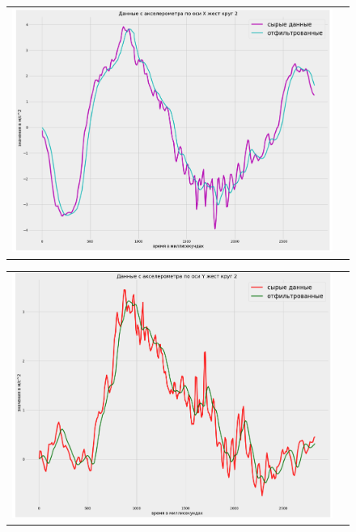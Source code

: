 \begin{figure}[H]
    \begin{center}
        \begin{tabular}{cc}
            \includegraphics[width=1\textwidth]{farim/cirxres.png} & 
        \end{tabular}
    \end{center}
\end{figure}

\begin{figure}[H]
    \begin{center}
        \begin{tabular}{cc}
            \includegraphics[width=1\textwidth]{farim/ciryres.png} & 
        \end{tabular}
    \end{center}
\end{figure}


